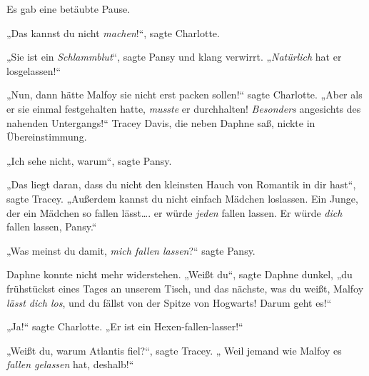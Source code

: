 Es gab eine betäubte Pause.

„Das kannst du nicht \emph{machen}!“, sagte Charlotte.

„Sie ist ein \emph{Schlammblut}“, sagte Pansy und klang verwirrt. „\emph{Natürlich} hat er losgelassen!“

„Nun, dann hätte Malfoy sie nicht erst packen sollen!“ sagte Charlotte. „Aber als er sie einmal festgehalten hatte, \emph{musste} er durchhalten! \emph{Besonders} angesichts des nahenden Untergangs!“ Tracey Davis, die neben Daphne saß, nickte in Übereinstimmung.

„Ich sehe nicht, warum“, sagte Pansy.

„Das liegt daran, dass du nicht den kleinsten Hauch von Romantik in dir hast“, sagte Tracey. „Außerdem kannst du nicht einfach Mädchen loslassen. Ein Junge, der ein Mädchen so fallen lässt…. er würde \emph{jeden} fallen lassen. Er würde \emph{dich} fallen lassen, Pansy.“

„Was meinst du damit, \emph{mich fallen lassen}?“ sagte Pansy.

Daphne konnte nicht mehr widerstehen. „Weißt du“, sagte Daphne dunkel, „du frühstückst eines Tages an unserem Tisch, und das nächste, was du weißt, Malfoy \emph{lässt dich los}, und du fällst von der Spitze von Hogwarts! Darum geht es!“

„Ja!“ sagte Charlotte. „Er ist ein Hexen-fallen-lasser!“

„Weißt du, warum Atlantis fiel?“, sagte Tracey. „ Weil jemand wie Malfoy es \emph{fallen gelassen} hat, deshalb!“

